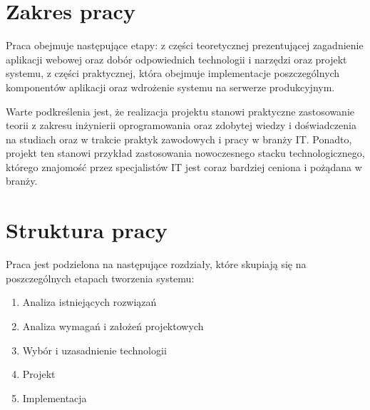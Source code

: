 \section*{Zakres pracy}

Praca obejmuje następujące etapy: z części teoretycznej prezentującej zagadnienie aplikacji webowej oraz dobór odpowiednich technologii i narzędzi oraz projekt systemu,
z części praktycznej, która obejmuje implementacje poszczególnych komponentów aplikacji oraz wdrożenie systemu na serwerze produkcyjnym.

Warte podkreślenia jest, że realizacja projektu stanowi praktyczne zastosowanie teorii z zakresu inżynierii oprogramowania oraz zdobytej wiedzy i doświadczenia na studiach
oraz w trakcie praktyk zawodowych i pracy w branży IT. Ponadto, projekt ten stanowi przykład zastosowania nowoczesnego stacku technologicznego, którego znajomość przez specjalistów IT jest coraz bardziej ceniona i pożądana w branży.

\section*{Struktura pracy}

Praca jest podzielona na następujące rozdziały, które skupiają się na poszczególnych etapach tworzenia systemu:

\begin{enumerate}
	\item Analiza istniejących rozwiązań
	\item Analiza wymagań i założeń projektowych
	\item Wybór i uzasadnienie technologii
	\item Projekt
	\item Implementacja
\end{enumerate}



